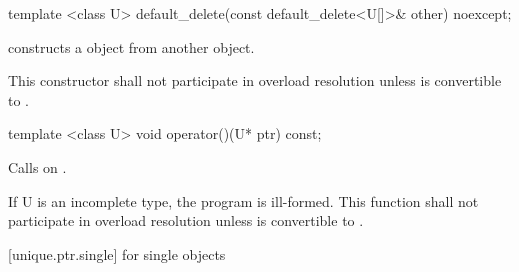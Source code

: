 \begin{itemdecl}
template <class U> default_delete(const default_delete<U[]>& other) noexcept;
\end{itemdecl}

\begin{itemdescr}
\pnum
\effects
constructs a  object from another  object.

\pnum
\remarks
This constructor shall not participate in overload resolution unless  is
convertible to .
\end{itemdescr}

\begin{itemdecl}
template <class U> void operator()(U* ptr) const;
\end{itemdecl}

\begin{itemdescr}
\pnum
\effects
Calls  on .

\pnum
\remarks If U is an incomplete type, the program is ill-formed.
This function shall not participate in overload resolution
unless  is convertible to .
\end{itemdescr}

[unique.ptr.single]{ for single objects}

